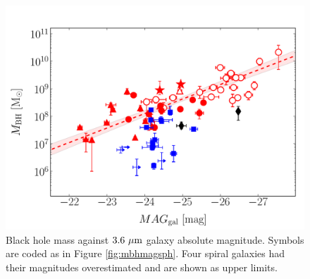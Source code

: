 \documentclass[preprint2]{emulateapj}
\begin{document}
\begin{figure}[h]
\begin{center}
\includegraphics[width=\columnwidth]{images/mbh_vs_mag_tot.pdf}
\caption{Black hole mass against $3.6\rm~\mu m$ galaxy absolute magnitude. 
Symbols are coded as in Figure \ref{fig:mbhmagsph}.
Four spiral galaxies had their magnitudes overestimated and are shown as upper limits. 
}
\label{fig:mbhmaggal}
\end{center}
\end{figure}
\end{document}
